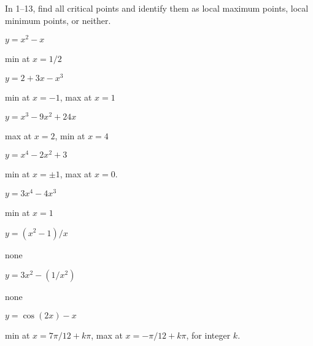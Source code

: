 \begin{exercises}
In 1--13,
find all critical points and identify them as
local maximum points, local minimum points, or neither.

\twocol

\begin{exercise} $y=x^2-x$ 
\begin{answer} min at $x=1/2$
\end{answer}\end{exercise}

\begin{exercise} $y=2+3x-x^3$ 
\begin{answer} min at $x=-1$, max at $x=1$
\end{answer}\end{exercise}

\begin{exercise} $y=x^3-9x^2+24x$
\begin{answer} max at $x=2$, min at $x=4$
\end{answer}\end{exercise}

\begin{exercise} $y=x^4-2x^2+3$ 
\begin{answer} min at $x=\pm 1$, max at $x=0$.
\end{answer}\end{exercise}

\begin{exercise} $y=3x^4-4x^3$
\begin{answer} min at $x=1$
\end{answer}\end{exercise}

\begin{exercise} $y=(x^2-1)/x$
\begin{answer} none
\end{answer}\end{exercise}

\begin{exercise} $y=3x^2-(1/x^2)$ 
\begin{answer} none
\end{answer}\end{exercise}

\begin{exercise} $y=\cos(2x)-x$ 
\begin{answer} min at $x=7\pi/12+k\pi$, max at $x=-\pi/12+k\pi$, for integer $k$.
\end{answer}\end{exercise}


\end{exercises}
